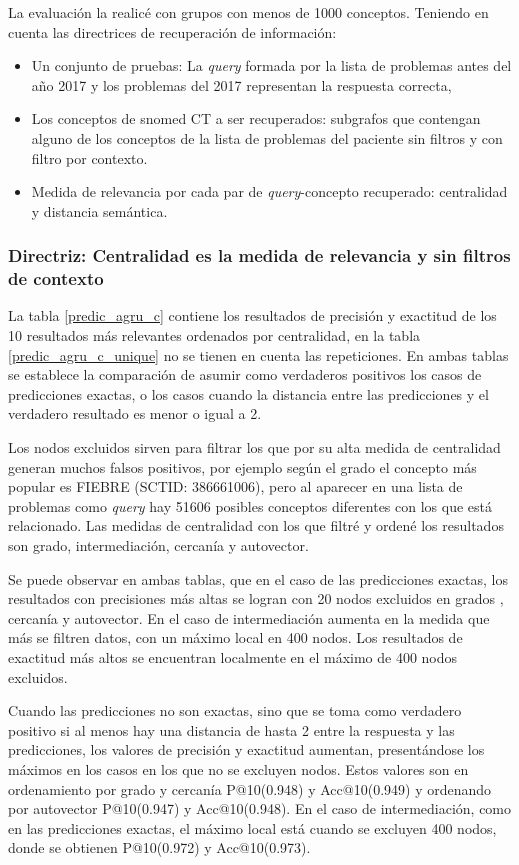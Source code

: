 La evaluación la realicé con grupos con menos de 1000 conceptos. Teniendo en cuenta las directrices de recuperación de información: 
\begin{itemize}
\item Un conjunto de pruebas: La \textit{query} formada por la lista de problemas antes del año 2017 y los problemas del 2017 representan la respuesta correcta,
\item Los conceptos de snomed CT a ser recuperados: subgrafos que contengan alguno de los conceptos de la lista de problemas del paciente sin filtros y con filtro por contexto.
\item  Medida de relevancia por cada par de \textit{query}-concepto recuperado: centralidad y distancia semántica.
\end{itemize}

\subsubsection{Directriz: Centralidad es la medida de relevancia y sin filtros de contexto}

La tabla \ref{predic_agru_c} contiene los resultados de precisión y exactitud de los 10  resultados más relevantes ordenados por centralidad, en la tabla \ref{predic_agru_c_unique} no se tienen en cuenta las repeticiones. En ambas tablas se establece la comparación de asumir como verdaderos positivos los casos de predicciones exactas, o los casos cuando la distancia entre las predicciones y el verdadero resultado es menor o igual a 2. 

Los nodos excluidos sirven para filtrar los que por su alta medida de centralidad generan muchos falsos positivos, por ejemplo según el grado el concepto más popular es FIEBRE (SCTID: 386661006), pero al aparecer en una lista de problemas como \textit{query} hay \num{51606} posibles conceptos diferentes con los que está relacionado. Las medidas de centralidad con los que filtré y ordené los resultados son grado, intermediación, cercanía y autovector. 

Se puede observar en ambas tablas, que en el caso de las predicciones exactas, los resultados con precisiones más altas se logran con 20 nodos excluidos en grados , cercanía y autovector. En el caso de intermediación aumenta en la medida que más se filtren datos, con un máximo local en 400 nodos. Los resultados de exactitud más altos se encuentran localmente en el máximo de 400 nodos excluidos.

Cuando las predicciones no son exactas, sino que se toma como verdadero positivo si al menos hay una distancia de hasta 2 entre la respuesta y las predicciones, los valores de precisión y exactitud aumentan, presentándose los máximos en los casos en los que no se excluyen nodos. Estos valores son en ordenamiento por grado y cercanía P@10(\num{0,948}) y Acc@10(\num{0,949}) y ordenando por autovector P@10(\num{0,947}) y Acc@10(\num{0,948}). En el caso de intermediación, como en las predicciones exactas, el máximo local está cuando se excluyen 400 nodos, donde se obtienen P@10(\num{0,972}) y Acc@10(\num{0,973}). 

